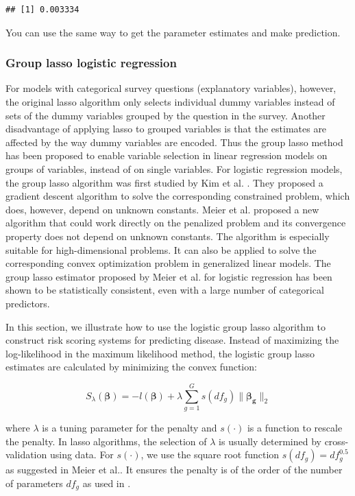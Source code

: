 \documentclass[12pt,]{krantz}
\begin{document}
\begin{verbatim}
## [1] 0.003334
\end{verbatim}

You can use the same way to get the parameter estimates and make prediction.

\hypertarget{group-lasso-logistic-regression}{%
\subsubsection{Group lasso logistic regression}\label{group-lasso-logistic-regression}}

For models with categorical survey questions (explanatory variables), however, the original lasso algorithm only selects individual dummy variables instead of sets of the dummy variables grouped by the question in the survey. Another disadvantage of applying lasso to grouped variables is that the estimates are affected by the way dummy variables are encoded. Thus the group lasso \citep{Yuan2007} method has been proposed to enable variable selection in linear regression models on groups of variables, instead of on single variables. For logistic regression models, the group lasso algorithm was first studied by Kim et al. \citep{Kim2006}. They proposed a gradient descent algorithm to solve the corresponding constrained problem, which does, however, depend on unknown constants. Meier et al. \citep{Meier2008} proposed a new algorithm that could work directly on the penalized problem and its convergence property does not depend on unknown constants. The algorithm is especially suitable for high-dimensional problems. It can also be applied to solve the corresponding convex optimization problem in generalized linear models. The group lasso estimator proposed by Meier et al. \citep{Meier2008} for logistic regression has been shown to be statistically consistent, even with a large number of categorical predictors.

In this section, we illustrate how to use the logistic group lasso algorithm to construct risk scoring systems for predicting disease. Instead of maximizing the log-likelihood in the maximum likelihood method, the logistic group lasso estimates are calculated by minimizing the convex function:

\[
S_{\lambda}(\symbf{\beta})=-l(\symbf{\beta})+\lambda\sum_{g=1}^{G}s(df_{g})\parallel\symbf{\beta_{g}}\parallel_{2}
\]

where \(\lambda\) is a tuning parameter for the penalty and \(s(\cdot)\) is a function to rescale the penalty. In lasso algorithms, the selection of \(\lambda\) is usually determined by cross-validation using data. For \(s(\cdot)\), we use the square root function \(s(df_g)=df_g^{0.5}\) as suggested in Meier et al.\citep{Meier2008}. It ensures the penalty is of the order of the number of parameters \(df_g\) as used in \citep{Yuan2007}.
\end{document}
